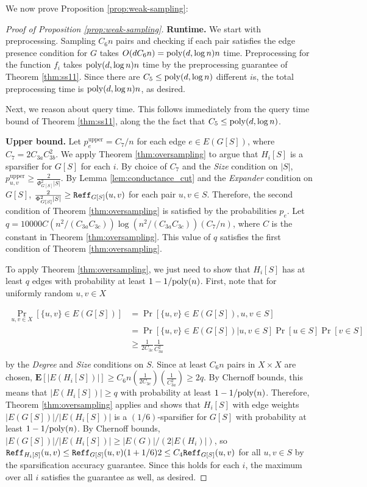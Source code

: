 We now prove Proposition \ref{prop:weak-sampling}:

\begin{proof}[Proof of Proposition \ref{prop:weak-sampling}]
\textbf{Runtime.} We start with preprocessing. Sampling $C_6 n$ pairs and checking if each pair satisfies the edge presence condition for $G$ takes $O(d C_6 n) = \mathrm{poly}(d,\log n) n$ time. Preprocessing for the function $f_i$ takes $\mathrm{poly}(d,\log n) n$ time by the preprocessing guarantee of Theorem \ref{thm:ss11}. Since there are $C_5 \le \mathrm{poly}(d,\log n)$ different $i$s, the total preprocessing time is $\mathrm{poly}(d,\log n) n$, as desired.

Next, we reason about query time. This follows immediately from the query time bound of Theorem \ref{thm:ss11}, along the the fact that $C_5 \le \mathrm{poly}(d,\log n)$.

\textbf{Upper bound.} Let $p_e^{\text{upper}} = C_7/n$ for each edge $e\in E(G[S])$, where $C_7 = 2C_{3a}C_{3b}^2$. We apply Theorem \ref{thm:oversampling} to argue that $H_i[S]$ is a sparsifier for $G[S]$ for each $i$. By choice of $C_7$ and the \emph{Size} condition on $|S|$, $p_{u,v}^{\text{upper}}\ge \frac{2}{\Phi_{G[S]}^2 |S|}$. By Lemma \ref{lem:conductance_cut} and the \emph{Expander} condition on $G[S]$, $\frac{2}{\Phi_{G[S]}^2 |S|}\ge \mathtt{Reff}_{G[S]}(u,v)$ for each pair $u,v\in S$. Therefore, the second condition of Theorem \ref{thm:oversampling} is satisfied by the probabilities $p_e$. Let $q = 10000C (n^2/(C_{3a}C_{3c})) \log(n^2/(C_{3a}C_{3c})) (C_7/n)$, where $C$ is the constant in Theorem \ref{thm:oversampling}. This value of $q$ satisfies the first condition of Theorem \ref{thm:oversampling}.

To apply Theorem \ref{thm:oversampling}, we just need to show that $H_i[S]$ has at least $q$ edges with probability at least $1 - 1/\mathrm{poly}(n)$. First, note that for uniformly random $u,v\in X$

\begin{align*}
    \Pr_{u,v\in X}[\{u,v\}\in E(G[S])] &= \Pr[\{u,v\}\in E(G[S]), u,v\in S]\\
    &= \Pr[\{u,v\}\in E(G[S]) | u,v\in S] \Pr[u\in S]\Pr[v\in S]\\
    &\ge \frac{1}{2C_{3c}} \frac{1}{C_{3a}^2}\\
\end{align*}
by the \emph{Degree} and \emph{Size} conditions on $S$. Since at least $C_6n$ pairs in $X\times X$ are chosen, $\textbf{E}[|E(H_i[S])|]\ge C_6 n (\frac{1}{2C_{3c}})(\frac{1}{C_{3a}^2})\ge 2q$. By Chernoff bounds, this means that $|E(H_i[S])|\ge q$ with probability at least $1 - 1/\mathrm{poly}(n)$. Therefore, Theorem \ref{thm:oversampling} applies and shows that $H_i[S]$ with edge weights $|E(G[S])|/|E(H_i[S])|$ is a $(1/6)$-sparsifier for $G[S]$ with probability at least $1 - 1/\mathrm{poly}(n)$. By Chernoff bounds, $|E(G[S])|/|E(H_i[S])| \ge |E(G)|/(2|E(H_i)|)$, so $\mathtt{Reff}_{H_i[S]}(u,v)\le \mathtt{Reff}_{G[S]}(u,v) (1 + 1/6)2 \le C_4 \mathtt{Reff}_{G[S]}(u,v)$ for all $u,v\in S$ by the sparsification accuracy guarantee. Since this holds for each $i$, the maximum over all $i$ satisfies the guarantee as well, as desired.


\end{proof}
